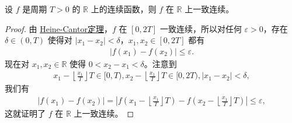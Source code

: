 \documentclass[../../main.tex]{subfiles}%
\begin{document}
\begin{proposition}[连续周期函数必一致连续]\label{proposition:连续周期函数必一致连续}
设 \(f\) 是周期 \(T > 0\) 的 \(\mathbb{R}\) 上的连续函数，则 \(f\) 在 \(\mathbb{R}\) 上一致连续。
\end{proposition}
\begin{proof}
由 \hyperref[theroem:Heine-Cantor定理]{Heine-Cantor定理}，\(f\) 在 \([0, 2T]\) 一致连续，所以对任何 \(\varepsilon > 0\)，存在 \(\delta \in (0, T)\) 使得对 \(|x_1 - x_2| < \delta\)，\(x_1, x_2 \in [0, 2T]\) 都有
\begin{align*}
|f(x_1) - f(x_2)| \leqslant \varepsilon.
\end{align*}
现在对 \(x_1, x_2 \in \mathbb{R}\) 使得 \(0 < x_2 - x_1 < \delta\)。注意到
\begin{align*}
x_1 - \left\lfloor \frac{x_1}{T} \right\rfloor T \in [0, T), x_2 - \left\lfloor \frac{x_1}{T} \right\rfloor T \in [0, 2T), |x_1 - x_2| < \delta,
\end{align*}
我们有
\begin{align*}
|f(x_1) - f(x_2)| = \left| f\left( x_1 - \left\lfloor \frac{x_1}{T} \right\rfloor T \right) - f\left( x_2 - \left\lfloor \frac{x_1}{T} \right\rfloor T \right) \right| \leqslant \varepsilon,
\end{align*}
这就证明了 \(f\) 在 \(\mathbb{R}\) 上一致连续。 
\end{proof}
\end{document}
